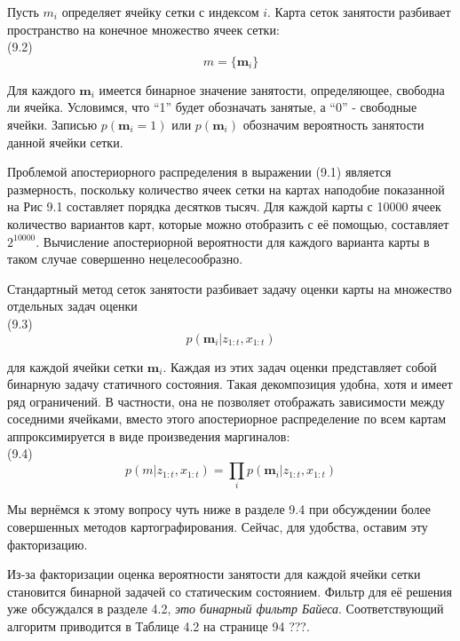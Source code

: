 \documentclass[10pt,a4paper]{article}
\begin{document}
Пусть $m_i$ определяет ячейку сетки с индексом $i$. Карта сеток занятости разбивает пространство на конечное множество ячеек сетки:\\

(9.2)
$$m=\{\textbf{m}_i\}$$

Для каждого $\textbf{m}_i$ имеется бинарное значение занятости, определяющее, свободна ли ячейка. Условимся, что “1” будет обозначать занятые, а “0” - свободные ячейки. Записью $p(\textbf{m}_i = 1)$ или $p(\textbf{m}_i)$ обозначим вероятность занятости данной ячейки сетки.

Проблемой апостериорного распределения в выражении (9.1) является размерность, поскольку количество ячеек сетки на картах наподобие показанной на Рис 9.1 составляет порядка десятков тысяч. Для каждой карты с 10000 ячеек количество вариантов карт, которые можно отобразить с её помощью, составляет $2^{10000}$. Вычисление апостериорной вероятности для каждого варианта карты в таком случае совершенно нецелесообразно.

Стандартный метод сеток занятости разбивает задачу оценки карты на множество отдельных задач оценки\\

(9.3)
$$p(\textbf{m}_i|z_{1:t},x_{1:t})$$

для каждой ячейки сетки $\textbf{m}_i$. Каждая из этих задач оценки представляет собой бинарную задачу статичного состояния. Такая декомпозиция удобна, хотя и имеет ряд ограничений. В частности, она не позволяет отображать зависимости между соседними ячейками, вместо этого апостериорное распределение по всем картам аппроксимируется в виде произведения маргиналов:\\

(9.4)
$$p(m|z_{1:t},x_{1:t})=\prod_i p(\textbf{m}_i|z_{1:t},x_{1:t})$$

Мы вернёмся к этому вопросу чуть ниже в разделе 9.4 при обсуждении более совершенных методов картографирования. Сейчас, для удобства, оставим эту факторизацию.

Из-за факторизации оценка вероятности занятости для каждой ячейки сетки становится бинарной задачей со статическим состоянием. Фильтр для её решения уже обсуждался в разделе 4.2, \textit{это бинарный фильтр Байеса}.   Соответствующий алгоритм приводится в Таблице 4.2 на странице 94 ???.
\end{document}
